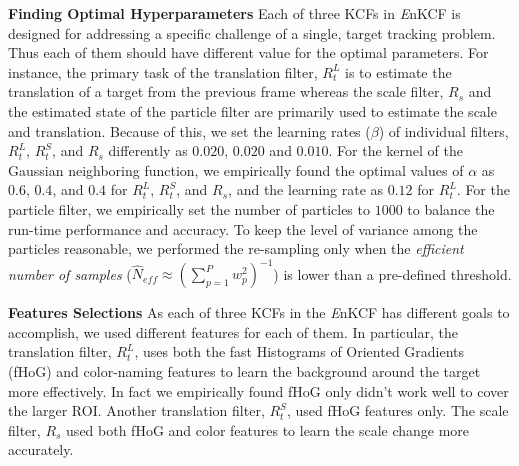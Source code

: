 \documentclass{bmvc2k}
\begin{document}
\textbf{Finding Optimal Hyperparameters} Each of three KCFs in {\it
  E}nKCF is designed for addressing a specific challenge of a single,
target tracking problem. Thus each of them should have different value
for the optimal parameters. For instance, the primary task of the
translation filter, $R_{t}^{L}$ is to estimate the translation of a
target from the previous frame whereas the scale filter, $R_{s}$ and
the estimated state of the particle filter are primarily used to
estimate the scale and translation. Because of this, we set the
learning rates ($\beta$) of individual filters, $R_{t}^{L}$,
$R_{t}^{S}$, and $R_{s}$ differently as $0.020$, $0.020$ and
$0.010$. For the kernel of the Gaussian neighboring function, we
empirically found the optimal values of $\alpha$ as $0.6$, $0.4$, and
$0.4$ for $R_{t}^{L}$, $R_{t}^{S}$, and $R_{s}$, and the learning rate
as $0.12$ for $R_{t}^{L}$. For the particle filter, we empirically set
the number of particles to $1000$ to balance the run-time performance
and accuracy. To keep the level of variance among the particles
reasonable, we performed the re-sampling only when the
\textit{efficient number of samples} ($ \hat{N}_{eff} \approx
(\sum_{p=1}^{P}w_{p}^{2})^{-1} $) is lower than a pre-defined
threshold. 

\textbf{Features Selections} As each of three KCFs in the {\it E}nKCF
has different goals to accomplish, we used different features for each
of them. In particular, the translation filter, $R_{t}^{L}$, uses both
the fast Histograms of Oriented Gradients
(fHoG)\cite{felzenszwalb2010object} and
color-naming\cite{van2009learning} features to learn the background
around the target more effectively. In fact we empirically found fHoG
only didn't work well to cover the larger ROI. Another translation
filter, $R_{t}^{S}$, used fHoG features only. The scale filter,
$R_{s}$ used both fHoG and color features to learn the scale change
more accurately.
\end{document}
